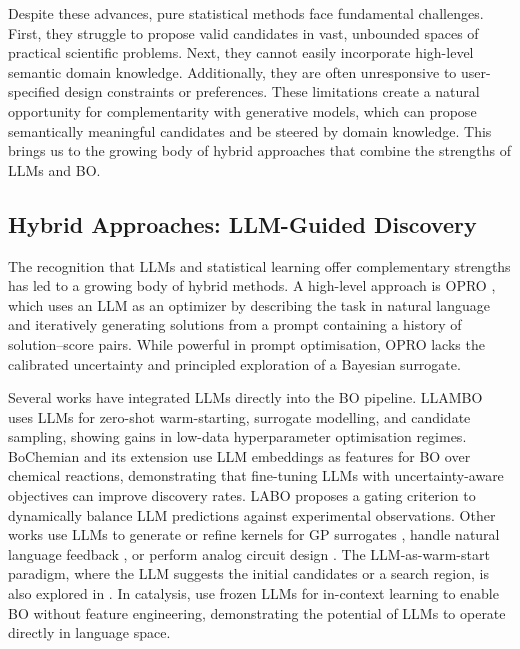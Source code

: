 Despite these advances, pure statistical methods face fundamental challenges. First, they struggle to propose valid candidates in vast, unbounded spaces of practical scientific problems. Next, they cannot easily incorporate high-level semantic domain knowledge. Additionally, they are often unresponsive to user-specified design constraints or preferences. These limitations create a natural opportunity for complementarity with generative models, which can propose semantically meaningful candidates and be steered by domain knowledge. This brings us to the growing body of hybrid approaches that combine the strengths of LLMs and BO.

\subsection{Hybrid Approaches: LLM-Guided Discovery}

The recognition that LLMs and statistical learning offer complementary strengths has led to a growing body of hybrid methods. A high-level approach is OPRO \citep{yangLargeLanguageModels2024}, which uses an LLM as an optimizer by describing the task in natural language and iteratively generating solutions from a prompt containing a history of solution--score pairs. While powerful in prompt optimisation, OPRO lacks the calibrated uncertainty and principled exploration of a Bayesian surrogate.

Several works have integrated LLMs directly into the BO pipeline. LLAMBO \citep{liuLargeLanguageModels2024} uses LLMs for zero-shot warm-starting, surrogate modelling, and candidate sampling, showing gains in low-data hyperparameter optimisation regimes. BoChemian \citep{rankovicBoChemianLargeLanguage2023} and its extension \citep{rankovicLargeLanguageModels2025a} use LLM embeddings as features for BO over chemical reactions, demonstrating that fine-tuning LLMs with uncertainty-aware objectives can improve discovery rates. LABO \citep{chenLABOLLMAcceleratedBayesian2026} proposes a gating criterion to dynamically balance LLM predictions against experimental observations. Other works use LLMs to generate or refine kernels for GP surrogates \citep{suwandiAdaptiveKernelDesign2025}, handle natural language feedback \citep{kobalczykLILOBayesianOptimization2025}, or perform analog circuit design \citep{yinADOLLMAnalogDesign2024,chenLLMEnhancedBayesianOptimization2024}. The LLM-as-warm-start paradigm, where the LLM suggests the initial candidates or a search region, is also explored in \citep{ramosBayesianOptimizationCatalysis2025, yinADOLLMAnalogDesign2024}. In catalysis, \citet{ramosBayesianOptimizationCatalysis2025} use frozen LLMs for in-context learning to enable BO without feature engineering, demonstrating the potential of LLMs to operate directly in language space.

